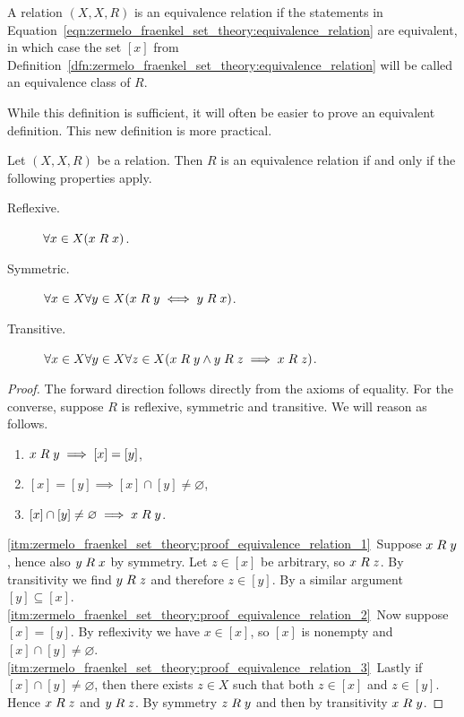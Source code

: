 \documentclass[../main.tex]{subfiles}
\begin{document}
\begin{definition}
    A relation $(X,X,R)$ is an equivalence relation if the statements in Equation~\eqref{eqn:zermelo_fraenkel_set_theory:equivalence_relation} are equivalent, in which case the set $[x]$ from Definition~\ref{dfn:zermelo_fraenkel_set_theory:equivalence_relation} will be called an equivalence class of $R$.
\end{definition}
While this definition is sufficient, it will often be easier to prove an equivalent definition. This new definition is more practical.
\begin{proposition}
    Let $(X,X,R)$ be a relation. Then $R$ is an equivalence relation if and only if the following properties apply.
    \begin{description}
        \item[Reflexive.] $\forall x\in X(x\mathrel{R} x)$.
        \item[Symmetric.] $\forall x\in X\forall y\in X(x\mathrel{R} y\iff y\mathrel{R} x)$.
        \item[Transitive.] $\forall x\in X\forall y\in X\forall z\in X(x\mathrel{R} y\land y\mathrel{R} z\implies x\mathrel{R} z)$.
    \end{description}
\end{proposition}
\begin{proof}
    The forward direction follows directly from the axioms of equality. For the converse, suppose $R$ is reflexive, symmetric and transitive. We will reason as follows.
    \begin{enumerate}[label=\arabic*.]
        \item\label{itm:zermelo_fraenkel_set_theory:proof_equivalence_relation_1} $x\mathrel{R} y\implies[x]=[y]$,
        \item\label{itm:zermelo_fraenkel_set_theory:proof_equivalence_relation_2} $[x]=[y]\implies[x]\cap[y]\neq\varnothing$,
        \item\label{itm:zermelo_fraenkel_set_theory:proof_equivalence_relation_3} $[x]\cap[y]\neq\varnothing\implies x\mathrel{R} y$.
    \end{enumerate}
    \ref{itm:zermelo_fraenkel_set_theory:proof_equivalence_relation_1}~Suppose $x\mathrel{R} y$, hence also $y\mathrel{R} x$ by symmetry. Let $z\in[x]$ be arbitrary, so $x\mathrel{R} z$. By transitivity we find $y\mathrel{R} z$ and therefore $z\in[y]$. By a similar argument $[y]\subseteq[x]$. \ref{itm:zermelo_fraenkel_set_theory:proof_equivalence_relation_2}~Now suppose $[x]=[y]$. By reflexivity we have $x\in[x]$, so $[x]$ is nonempty and $[x]\cap[y]\neq\varnothing$. \ref{itm:zermelo_fraenkel_set_theory:proof_equivalence_relation_3}~Lastly if $[x]\cap[y]\neq\varnothing$, then there exists $z\in X$ such that both $z\in[x]$ and $z\in[y]$. Hence $x\mathrel{R} z$ and $y\mathrel{R} z$. By symmetry $z\mathrel{R} y$ and then by transitivity $x\mathrel{R} y$.
\end{proof}
\end{document}
